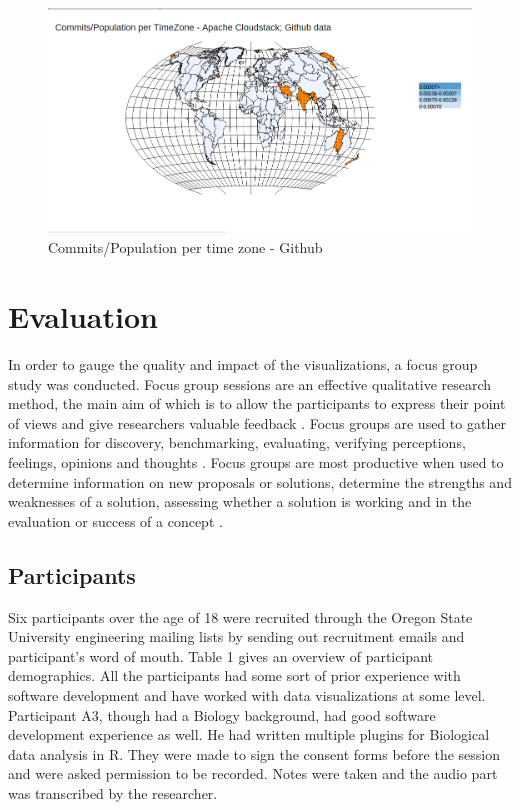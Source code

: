 \documentclass[double,12pt]{beavtex}
\begin{document}
\begin{figure}[H]
\centering
\includegraphics[width=130mm,height=60mm]{image10.png}
\caption{Commits/Population per time zone - Github}
\label{fig:div3}
\end{figure}

\chapter{Evaluation}
In order to gauge the quality and impact of the visualizations, a focus group study was conducted. Focus group sessions are an effective qualitative research method, the main aim of which is to allow the participants to express their point of views and give researchers valuable feedback \cite{villard}.  Focus groups are used to gather information for discovery, benchmarking, evaluating, verifying perceptions, feelings, opinions and thoughts \cite{patton1990}. Focus groups are most productive when used to determine information on new proposals or solutions, determine the strengths and weaknesses of a solution, assessing whether a solution is working and in the evaluation or success of a concept \cite{greenbaum1993}.

\section{Participants}
Six participants over the age of 18 were recruited through the Oregon State University engineering mailing lists by sending out recruitment emails and participant's word of mouth. Table 1 gives an overview of participant demographics. All the participants had some sort of prior experience with software development and have worked with data visualizations at some level. Participant A3, though had a Biology background, had good software development experience as well. He had written multiple plugins for Biological data analysis in R. They were made to sign the consent forms before the session and were asked permission to be recorded. Notes were taken and the audio part was transcribed by the researcher.
\end{document}
